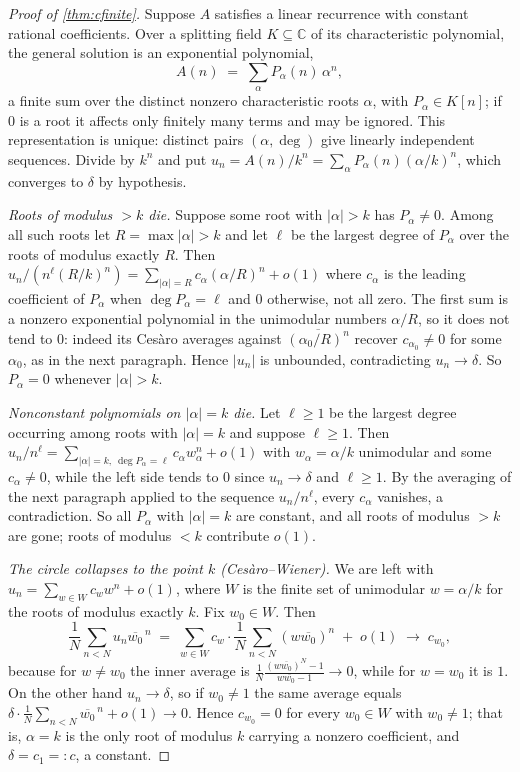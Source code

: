 \documentclass[11pt]{amsart}
\theoremstyle{definition}
\theoremstyle{remark}
\begin{document}
\begin{proof}[Proof of \cref{thm:cfinite}]
Suppose $A$ satisfies a linear recurrence with constant rational coefficients. Over a splitting field $K \subseteq \mathbb{C}$ of its characteristic polynomial, the general solution is an exponential polynomial,
\[
  A(n) \;=\; \sum_{\alpha} P_{\alpha}(n)\,\alpha^{n},
\]
a finite sum over the distinct nonzero characteristic roots $\alpha$, with $P_\alpha \in K[n]$; if $0$ is a root it affects only finitely many terms and may be ignored. This representation is unique: distinct pairs $(\alpha, \deg)$ give linearly independent sequences. Divide by $k^{n}$ and put $u_n = A(n)/k^{n} = \sum_\alpha P_\alpha(n)(\alpha/k)^{n}$, which converges to $\delta$ by hypothesis.

\emph{Roots of modulus $>k$ die.} Suppose some root with $|\alpha|>k$ has $P_\alpha \ne 0$. Among all such roots let $R = \max|\alpha| > k$ and let $\ell$ be the largest degree of $P_\alpha$ over the roots of modulus exactly $R$. Then $u_n / (n^{\ell}(R/k)^{n}) = \sum_{|\alpha| = R} c_\alpha (\alpha/R)^{n} + o(1)$ where $c_\alpha$ is the leading coefficient of $P_\alpha$ when $\deg P_\alpha = \ell$ and $0$ otherwise, not all zero. The first sum is a nonzero exponential polynomial in the unimodular numbers $\alpha/R$, so it does not tend to $0$: indeed its Ces\`aro averages against $\overline{(\alpha_0/R)^{n}}$ recover $c_{\alpha_0} \ne 0$ for some $\alpha_0$, as in the next paragraph. Hence $|u_n|$ is unbounded, contradicting $u_n \to \delta$. So $P_\alpha = 0$ whenever $|\alpha| > k$.

\emph{Nonconstant polynomials on $|\alpha| = k$ die.} Let $\ell \ge 1$ be the largest degree occurring among roots with $|\alpha| = k$ and suppose $\ell \ge 1$. Then $u_n/n^{\ell} = \sum_{|\alpha|=k,\ \deg P_\alpha = \ell} c_\alpha w_\alpha^{n} + o(1)$ with $w_\alpha = \alpha/k$ unimodular and some $c_\alpha \ne 0$, while the left side tends to $0$ since $u_n \to \delta$ and $\ell \ge 1$. By the averaging of the next paragraph applied to the sequence $u_n/n^\ell$, every $c_\alpha$ vanishes, a contradiction. So all $P_\alpha$ with $|\alpha| = k$ are constant, and all roots of modulus $>k$ are gone; roots of modulus $<k$ contribute $o(1)$.

\emph{The circle collapses to the point $k$ (Ces\`aro--Wiener).} We are left with $u_n = \sum_{w \in W} c_w w^{n} + o(1)$, where $W$ is the finite set of unimodular $w = \alpha/k$ for the roots of modulus exactly $k$. Fix $w_0 \in W$. Then
\[
  \frac{1}{N}\sum_{n<N} u_n \overline{w_0}^{\,n}
  \;=\; \sum_{w \in W} c_w \cdot \frac{1}{N}\sum_{n<N} (w\overline{w_0})^{n} \;+\; o(1)
  \;\longrightarrow\; c_{w_0},
\]
because for $w \ne w_0$ the inner average is $\frac{1}{N}\frac{(w\overline{w_0})^{N}-1}{w\overline{w_0}-1} \to 0$, while for $w = w_0$ it is $1$. On the other hand $u_n \to \delta$, so if $w_0 \ne 1$ the same average equals $\delta \cdot \frac{1}{N}\sum_{n<N}\overline{w_0}^{\,n} + o(1) \to 0$. Hence $c_{w_0} = 0$ for every $w_0 \in W$ with $w_0 \ne 1$; that is, $\alpha = k$ is the only root of modulus $k$ carrying a nonzero coefficient, and $\delta = c_1 =: c$, a constant.


\end{proof}
\end{document}
